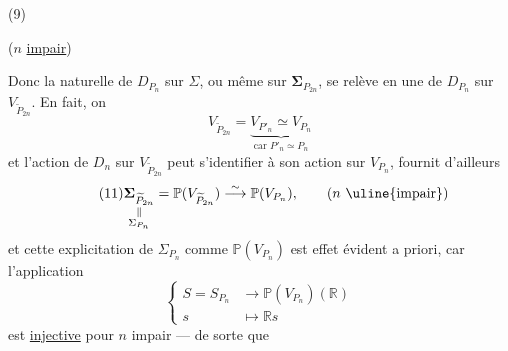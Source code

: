 (9)

($n$ \uline{impair})

Donc la   naturelle de $D_{P_n}$ sur $\Sigma$, ou même sur $\boldsymbol\Sigma_{P_{2n}}$,  se relève en une   de $D_{P_n}$ sur $V_{\widetilde P_{2n}}$. En fait, on  
\[
\tag{10}
V_{\widetilde P_{2n}}=\underbrace{V_{P'_n}\simeq V_{P_n}}_{\text{car }P'_n\simeq P_n}
\]
et l'action de $D_n$ sur $V_{\widetilde P_{2n}}$ peut s'identifier à son action sur $V_{P_n}$,
 fournit d'ailleurs
\[
\tag{11}
\underset{\substack{\Vert\\\Sigma_{P_n}}}{\boldsymbol\Sigma_{\widetilde P_{2n}}}
=\mathbb P(V_{\widetilde P_{2n}})\overset\sim\longrightarrow\mathbb P(V_{P_n}),
\qquad(n\ \text{\uline{impair}})
\]
 et cette explicitation de $\Sigma_{P_n}$ comme $\mathbb P(V_{P_n})$ est  effet évident a priori, car l'application
\[
\left\{
\begin{aligned}
S=S_{P_n}&\longrightarrow\mathbb P(V_{P_n})(\mathbb R)\\
s&\longmapsto\mathbb R s
\end{aligned}
\right.
\]
est \uline{injective} pour $n$ impair — de sorte que

